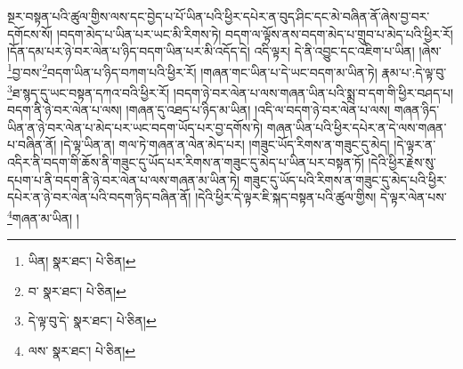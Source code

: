 སྔར་བསྟན་པའི་ཚུལ་གྱིས་ལས་དང་བྱེད་པ་པོ་ཡིན་པའི་ཕྱིར་དཔེར་ན་བུད་ཤིང་དང་མེ་བཞིན་ནོ་ཞེས་བྱ་བར་དགོངས་སོ། །བདག་མེད་པ་ཡིན་པར་ཡང་མི་རིགས་ཏེ། བདག་ལ་ལྟོས་ནས་བདག་མེད་པ་གྲུབ་པ་མེད་པའི་ཕྱིར་རོ། །དོན་དམ་པར་ཉེ་བར་ལེན་པ་ཉིད་བདག་ཡིན་པར་མི་འདོད་དེ། འདི་ལྟར། དེ་ནི་འབྱུང་དང་འཇིག་པ་ཡིན། །ཞེས་\footnote{ཡིན།   སྣར་ཐང་།  པེ་ཅིན། }བྱ་བས་\footnote{བ་  སྣར་ཐང་།  པེ་ཅིན། }བདག་ཡིན་པ་ཉིད་བཀག་པའི་ཕྱིར་རོ། །གཞན་གང་ཡིན་པ་དེ་ཡང་བདག་མ་ཡིན་ཏེ། རྣམ་པ་:དེ་ལྟ་བུ་\footnote{དེ་ལྟ་བུ་དེ་  སྣར་ཐང་།  པེ་ཅིན། }ཐ་སྙད་དུ་ཡང་བསྟན་དཀའ་བའི་ཕྱིར་རོ། །བདག་ཉེ་བར་ལེན་པ་ལས་གཞན་ཡིན་པའི་སྨྲ་བ་དག་གི་ཕྱིར་བཤད་པ། བདག་ནི་ཉེ་བར་ལེན་པ་ལས། །གཞན་དུ་འཐད་པ་ཉིད་མ་ཡིན། །འདི་ལ་བདག་ཉེ་བར་ལེན་པ་ལས། གཞན་ཉིད་ཡིན་ན་ཉེ་བར་ལེན་པ་མེད་པར་ཡང་བདག་ཡོད་པར་བྱ་དགོས་ཏེ། གཞན་ཡིན་པའི་ཕྱིར་དཔེར་ན་དེ་ལས་གཞན་པ་བཞིན་ནོ། །དེ་ལྟ་ཡིན་ན། གལ་ཏེ་གཞན་ན་ལེན་མེད་པར། །གཟུང་ཡོད་རིགས་ན་གཟུང་དུ་མེད། །དེ་ལྟར་ན་འདིར་ནི་བདག་གི་ཆོས་ནི་གཟུང་དུ་ཡོད་པར་རིགས་ན་གཟུང་དུ་མེད་པ་ཡིན་པར་བསྟན་ཏོ། །དེའི་ཕྱིར་རྗེས་སུ་དཔག་པ་ནི་བདག་ནི་ཉེ་བར་ལེན་པ་ལས་གཞན་མ་ཡིན་ཏེ། གཟུང་དུ་ཡོད་པའི་རིགས་ན་གཟུང་དུ་མེད་པའི་ཕྱིར་དཔེར་ན་ཉེ་བར་ལེན་པའི་བདག་ཉིད་བཞིན་ནོ། །དེའི་ཕྱིར་དེ་ལྟར་ཇི་སྐད་བསྟན་པའི་ཚུལ་གྱིས། དེ་ལྟར་ལེན་པས་\footnote{ལས་  སྣར་ཐང་།  པེ་ཅིན། }གཞན་མ་ཡིན། །
